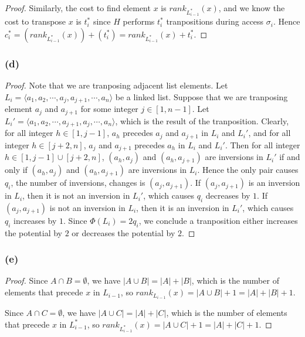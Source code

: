 \begin{proof}
    Similarly, the cost to find element $x$ is $rank_{L_{i-1}^*}(x)$,
    and we know the cost to transpose $x$ is $t_i^*$ 
    since $H$ performs $t_i^*$ tranpositions during access $\sigma_i$.
    Hence $c_i^* = (rank_{L_{i-1}^*}(x)) + (t_i^*) = rank_{L_{i-1}^*}(x) + t_i^*$.
\end{proof}

\subsubsection*{(d)}

\begin{proof}
    Note that we are tranposing adjacent list elements.
    Let $L_i = \langle a_1, a_2, \cdots, a_j, a_{j+1}, \cdots, a_n \rangle$ 
    be a linked list.
    Suppose that we are tranposing element $a_j$ and $a_{j+1}$
    for some integer $j \in [1,n-1]$.
    Let $L_i' = \langle a_1, a_2, \cdots, a_{j+1}, a_j, \cdots, a_n \rangle$,
    which is the result of the tranposition.
    Clearly, for all integer $h \in [1,j-1]$, 
    $a_h$ precedes $a_j$ and $a_{j+1}$ in $L_i$ and $L_i'$,
    and for all integer $h \in [j+2,n]$, 
    $a_j$ and $a_{j+1}$ precedes $a_h$ in $L_i$ and $L_i'$.
    Then for all integer $h \in [1,j-1] \cup [j+2,n]$, 
    $(a_h,a_j)$ and $(a_h,a_{j+1})$ are inversions in $L_i'$
    if and only if 
    $(a_h,a_j)$ and $(a_h,a_{j+1})$ are inversions in $L_i$.
    Hence the only pair causes $q_i$, the number of inversions, changes
    is $(a_j,a_{j+1})$.
    If $(a_j,a_{j+1})$ is an inversion in $L_i$,
    then it is not an inversion in $L_i'$,
    which causes $q_i$ decreases by $1$.
    If $(a_j,a_{j+1})$ is not an inversion in $L_i$,
    then it is an inversion in $L_i'$,
    which causes $q_i$ increases by $1$.
    Since $\Phi(L_i) = 2 q_i$,
    we conclude a tranposition either increases the potential by $2$
    or decreases the potential by $2$.
\end{proof}

\subsubsection*{(e)}

\begin{proof}
    Since $A \cap B = \emptyset$, we have $|A \cup B| = |A| + |B|$,
    which is the number of elements that precede $x$ in $L_{i-1}$,
    so $rank_{L_{i-1}}(x) = |A \cup B| + 1 = |A| + |B| + 1$. 
    
    Since $A \cap C = \emptyset$, we have $|A \cup C| = |A| + |C|$,
    which is the number of elements that precede $x$ in $L_{i-1}^*$,
    so $rank_{L_{i-1}^*}(x) = |A \cup C| + 1 = |A| + |C| + 1$. 
\end{proof}

